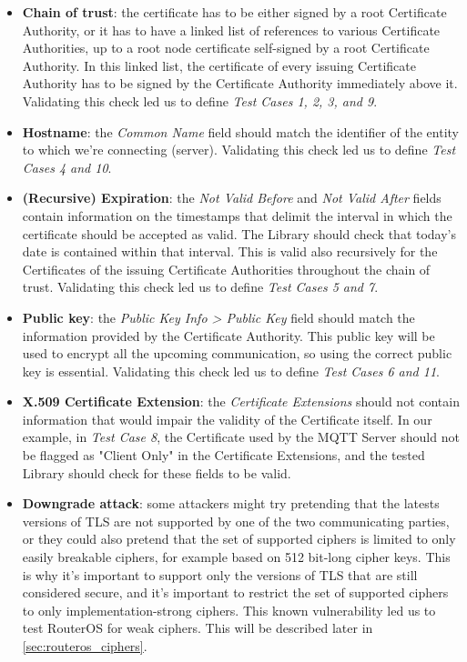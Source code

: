 \documentclass[binding=0.6cm,noexaminfo]{sapthesis}
\begin{document}
\begin{itemize}
	\item \textbf{Chain of trust}: the certificate has to be either signed by a root Certificate Authority, or it has to have a linked list of references to various Certificate Authorities, up to a root node certificate self-signed by a root Certificate Authority. In this linked list, the certificate of every issuing Certificate Authority has to be signed by the Certificate Authority immediately above it. Validating this check led us to define \textit{Test Cases 1, 2, 3, and 9}.
	\item \textbf{Hostname}: the \textit{Common Name} field should match the identifier of the entity to which we’re connecting (server). Validating this check led us to define \textit{Test Cases 4 and 10}.
	\item \textbf{(Recursive) Expiration}: the \textit{Not Valid Before} and \textit{Not Valid After} fields contain information on the timestamps that delimit the interval in which the certificate should be accepted as valid. The Library should check that today's date is contained within that interval. This is valid also recursively for the Certificates of the issuing Certificate Authorities throughout the chain of trust. Validating this check led us to define \textit{Test Cases 5 and 7}.
	\item \textbf{Public key}: the \textit{Public Key Info > Public Key} field should match the information provided by the Certificate Authority. This public key will be used to encrypt all the upcoming communication, so using the correct public key is essential. Validating this check led us to define \textit{Test Cases 6 and 11}.
	\item \textbf{X.509 Certificate Extension}: the \textit{Certificate Extensions} should not contain information that would impair the validity of the Certificate itself. In our example, in \textit{Test Case 8}, the Certificate used by the MQTT Server should not be flagged as "Client Only" in the Certificate Extensions, and the tested Library should check for these fields to be valid.
	\item \textbf{Downgrade attack}: some attackers might try pretending that the latests versions of TLS are not supported by one of the two communicating parties, or they could also pretend that the set of supported ciphers is limited to only easily breakable ciphers, for example based on 512 bit-long cipher keys. This is why it’s important to support only the versions of TLS that are still considered secure, and it’s important to restrict the set of supported ciphers to only implementation-strong ciphers. This known vulnerability led us to test RouterOS for weak ciphers. This will be described later in \autoref{sec:routeros_ciphers}.
\end{itemize}
\end{document}
